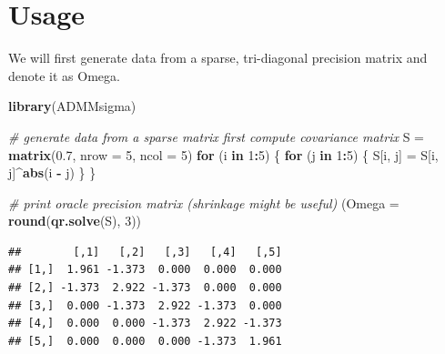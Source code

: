 \documentclass[12pt,]{book}
\newenvironment{Shaded}{\begin{snugshade}}{\end{snugshade}}
\newcommand{\CommentTok}[1]{\textcolor[rgb]{0.56,0.35,0.01}{\textit{#1}}}
\newcommand{\ControlFlowTok}[1]{\textcolor[rgb]{0.13,0.29,0.53}{\textbf{#1}}}
\newcommand{\DataTypeTok}[1]{\textcolor[rgb]{0.13,0.29,0.53}{#1}}
\newcommand{\DecValTok}[1]{\textcolor[rgb]{0.00,0.00,0.81}{#1}}
\newcommand{\FloatTok}[1]{\textcolor[rgb]{0.00,0.00,0.81}{#1}}
\newcommand{\KeywordTok}[1]{\textcolor[rgb]{0.13,0.29,0.53}{\textbf{#1}}}
\newcommand{\NormalTok}[1]{#1}
\newcommand{\OperatorTok}[1]{\textcolor[rgb]{0.81,0.36,0.00}{\textbf{#1}}}
\newcommand{\StringTok}[1]{\textcolor[rgb]{0.31,0.60,0.02}{#1}}
\theoremstyle{definition}
\theoremstyle{definition}
\theoremstyle{definition}
\theoremstyle{remark}
\begin{document}
\vspace{1cm}

\hypertarget{usage}{%
\section{Usage}\label{usage}}

We will first generate data from a sparse, tri-diagonal precision matrix
and denote it as Omega.

\vspace{0.5cm}

\begin{Shaded}
\begin{Highlighting}[]
\KeywordTok{library}\NormalTok{(ADMMsigma)}

\CommentTok{# generate data from a sparse matrix first compute covariance matrix}
\NormalTok{S =}\StringTok{ }\KeywordTok{matrix}\NormalTok{(}\FloatTok{0.7}\NormalTok{, }\DataTypeTok{nrow =} \DecValTok{5}\NormalTok{, }\DataTypeTok{ncol =} \DecValTok{5}\NormalTok{)}
\ControlFlowTok{for}\NormalTok{ (i }\ControlFlowTok{in} \DecValTok{1}\OperatorTok{:}\DecValTok{5}\NormalTok{) \{}
    \ControlFlowTok{for}\NormalTok{ (j }\ControlFlowTok{in} \DecValTok{1}\OperatorTok{:}\DecValTok{5}\NormalTok{) \{}
\NormalTok{        S[i, j] =}\StringTok{ }\NormalTok{S[i, j]}\OperatorTok{^}\KeywordTok{abs}\NormalTok{(i }\OperatorTok{-}\StringTok{ }\NormalTok{j)}
\NormalTok{    \}}
\NormalTok{\}}

\CommentTok{# print oracle precision matrix (shrinkage might be useful)}
\NormalTok{(}\DataTypeTok{Omega =} \KeywordTok{round}\NormalTok{(}\KeywordTok{qr.solve}\NormalTok{(S), }\DecValTok{3}\NormalTok{))}
\end{Highlighting}
\end{Shaded}

\begin{verbatim}
##        [,1]   [,2]   [,3]   [,4]   [,5]
## [1,]  1.961 -1.373  0.000  0.000  0.000
## [2,] -1.373  2.922 -1.373  0.000  0.000
## [3,]  0.000 -1.373  2.922 -1.373  0.000
## [4,]  0.000  0.000 -1.373  2.922 -1.373
## [5,]  0.000  0.000  0.000 -1.373  1.961
\end{verbatim}
\end{document}
